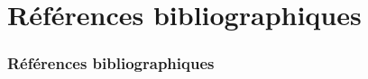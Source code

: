 \documentclass[10pt,    %
    french,             %
    xcolor=table,       %
    envcountsect,       %
    aspectratio=43      %
]{beamer}
\begin{document}
\section{Références bibliographiques}
\label{sec:biblio}
\sectionframe

\begin{frame}[t,allowframebreaks]
    \frametitle{Références bibliographiques}
    
    \printbibliography
\end{frame}



\end{document}
